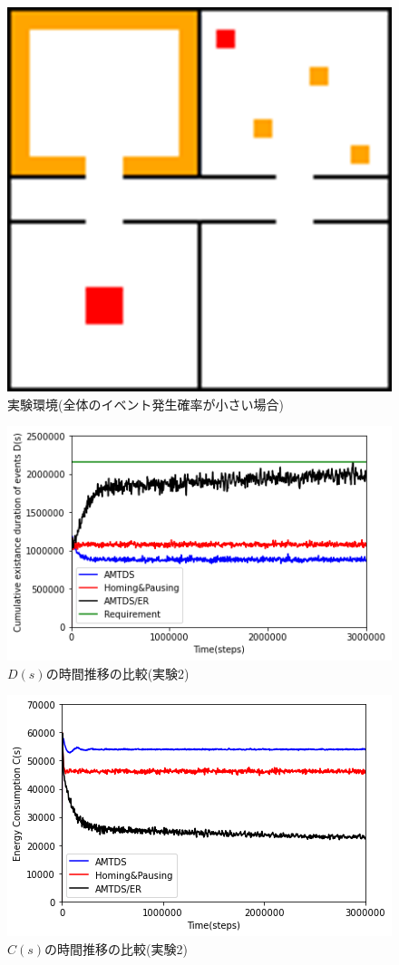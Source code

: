 \documentclass[12pt,a4j,twoside]{jarticle}
\begin{document}
  \begin{figure}
    \centering
    \includegraphics[width=0.6\hsize]{figures/Graph_Complex.png}
    \caption{実験環境(全体のイベント発生確率が小さい場合)}
    \label{fig:env2}
  \end{figure}

  \begin{figure}
    \centering
    \includegraphics[width=150mm]{figures/ds_graph_3600_ave_ER_Complex_600.png}
    \caption{$D(s)$の時間推移の比較(実験2)}
    \label{fig:ds_ER_Complex}
  \end{figure}

  \begin{figure}
    \centering
    \includegraphics[width=150mm]{figures/cs_graph_3600_ave_ER_Complex_600.png}
    \caption{$C(s)$の時間推移の比較(実験2)}
    \label{fig:cs_ER_Complex}
  \end{figure}
\end{document}
